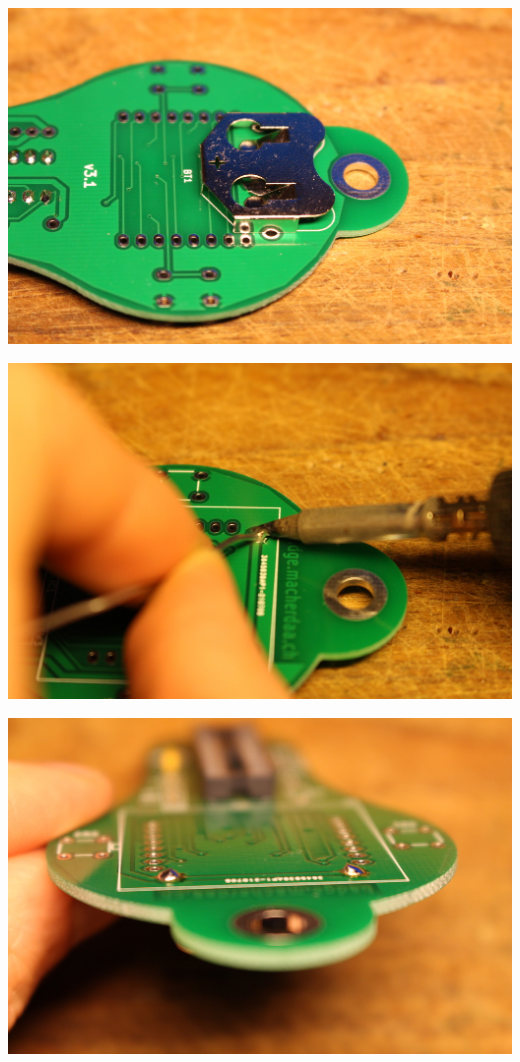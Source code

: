 \documentclass{article}
\begin{document}
\begin{minipage}[b]{0.5\textwidth}
	\includegraphics[width=\textwidth]{Bilder2021/IMG_8143.JPG}
\end{minipage}
\begin{minipage}[b]{0.5\textwidth}
	\includegraphics[width=\textwidth]{Bilder2021/IMG_8144.JPG}
\end{minipage}

\vspace{0.5cm}

\begin{minipage}[b]{0.5\textwidth}
	\includegraphics[width=\textwidth]{Bilder2021/IMG_8145.JPG}
\end{minipage}
\end{document}
